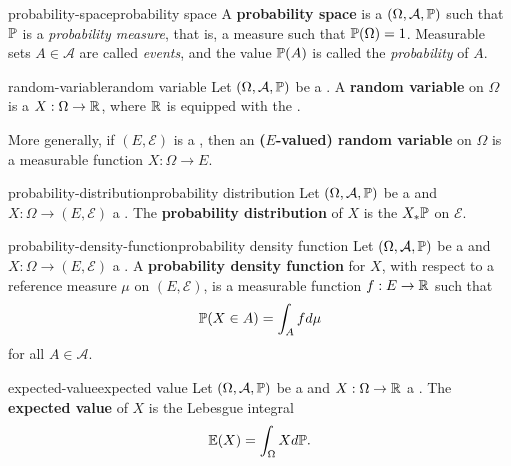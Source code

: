 \begin{topic}{probability-space}{probability space}
    A \textbf{probability space} is a  $(\Omega, \mathcal{A}, \mathbb{P})$ such that $\mathbb{P}$ is a \textit{probability measure}, that is, a measure such that $\mathbb{P}(\Omega) = 1$. Measurable sets $A \in \mathcal{A}$ are called \textit{events}, and the value $\mathbb{P}(A)$ is called the \textit{probability} of $A$.
\end{topic}

\begin{topic}{random-variable}{random variable}
    Let $(\Omega, \mathcal{A}, \mathbb{P})$ be a . A \textbf{random variable} on $\Omega$ is a  $X : \Omega \to \mathbb{R}$, where $\mathbb{R}$ is equipped with the .
    
    More generally, if $(E, \mathcal{E})$ is a , then an \textbf{($E$-valued) random variable} on $\Omega$ is a measurable function $X : \Omega \to E$.
\end{topic}

\begin{topic}{probability-distribution}{probability distribution}
    Let $(\Omega, \mathcal{A}, \mathbb{P})$ be a  and $X : \Omega \to (E, \mathcal{E})$ a . The \textbf{probability distribution} of $X$ is the  $X_* \mathbb{P}$ on $\mathcal{E}$.
\end{topic}

\begin{topic}{probability-density-function}{probability density function}
    Let $(\Omega, \mathcal{A}, \mathbb{P})$ be a  and $X : \Omega \to (E, \mathcal{E})$ a . A \textbf{probability density function} for $X$, with respect to a reference measure $\mu$ on $(E, \mathcal{E})$, is a measurable function $f : E \to \mathbb{R}$ such that
    \[ \mathbb{P}(X \in A) = \int_A f d \mu \]
    for all $A \in \mathcal{A}$.
\end{topic}

\begin{topic}{expected-value}{expected value}
    Let $(\Omega, \mathcal{A}, \mathbb{P})$ be a  and $X : \Omega \to \mathbb{R}$ a . The \textbf{expected value} of $X$ is the Lebesgue integral
    \[ \mathbb{E}(X) = \int_\Omega X d \mathbb{P} . \]
\end{topic}

